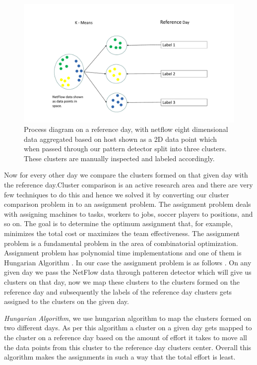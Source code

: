\begin{figure}[t]
	\centerline{\includegraphics[scale = 0.6]{cluster_comp.pdf}}
	\caption{Process diagram on a reference day, with netflow eight dimensional data aggregated based on host shown as a 2D data point which when passed through our pattern detector split into three clusters. These clusters are manually inspected and labeled accordingly. }%
\end{figure}

 Now for every other day we compare the clusters formed on that given day with the reference day.Cluster comparison is an active research area and there are very few techniques to do this and hence we solved it by converting our cluster comparison problem in to an assignment problem. The assignment problem deals with assigning machines to tasks, workers to jobs, soccer players to positions, and so on. The goal is to determine the optimum assignment that, for example, minimizes the total cost or maximizes the team effectiveness. The assignment problem is a fundamental problem in the area of combinatorial optimization. Assignment problem has polynomial time implementations and one of them is Hungarian Algorithm \cite{}.  In our case the assignment problem is as follows . On any given day we pass the NetFlow data through patteren detector which will give us clusters on that day, now we map these clusters to the clusters formed on the reference day and subsequently the labels of the reference day clusters gets assigned to the clusters on the given day. 
 
\textit{Hungarian Algorithm}, we use hungarian algorithm to map the clusters formed on two different days. As per this algorithm a cluster on a given day gets mapped to the cluster on a reference day based on the amount of effort it takes to move all the data points from this cluster to the reference day clusters center. Overall this algorithm makes the assignments in such a way that the total effort is least.
  
